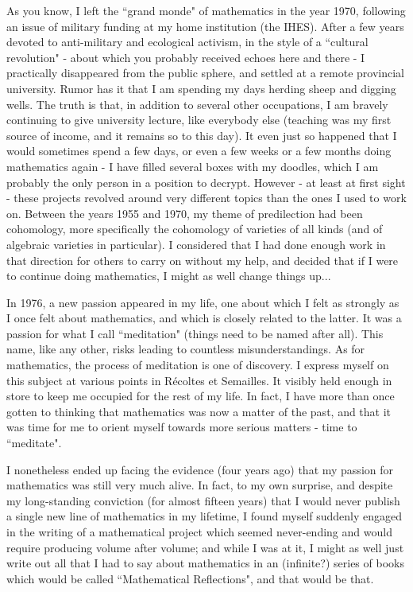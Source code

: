 As you know, I left the ``grand monde" of mathematics in the year 1970, following an issue of military funding at my home institution (the IHES). After a few years devoted to anti-military and ecological activism, in the style of a ``cultural revolution" - about which you probably received echoes here and there - I practically disappeared from the public sphere, and settled at a remote provincial university. Rumor has it that I am spending my days herding sheep and digging wells. The truth is that, in addition to several other occupations, I am bravely continuing to give university lecture, like everybody else (teaching was my first source of income, and it remains so to this day). It even just so happened that I would sometimes spend a few days, or even a few weeks or a few months doing mathematics again - I have filled several boxes with my doodles, which I am probably the only person in a position to decrypt. However - at least at first sight - these projects revolved around very different topics than the ones I used to work on. Between the years 1955 and 1970, my theme of predilection had been cohomology, more specifically the cohomology of varieties of all kinds (and of algebraic varieties in particular). I considered that I had done enough work in that direction for others to carry on without my help, and decided that if I were to continue doing mathematics, I might as well change things up...

In 1976, a new passion appeared in my life, one about which I felt as strongly as I once felt about mathematics, and which is closely related to the latter. It was a passion for what I call ``meditation" (things need to be named after all). This name, like any other, risks leading to countless misunderstandings. As for mathematics, the process of meditation is one of discovery. I express myself on this subject at various points in R\'ecoltes et Semailles. It visibly held enough in store to keep me occupied for the rest of my life. In fact, I have more than once gotten to thinking that mathematics was now a matter of the past, and that it was time for me to orient myself towards more serious matters - time to ``meditate".

I nonetheless ended up facing the evidence (four years ago) that my passion for mathematics was still very much alive. In fact, to my own surprise, and despite my long-standing conviction (for almost fifteen years) that I would never publish a single new line of mathematics in my lifetime, I found myself suddenly engaged in the writing of a mathematical project which seemed never-ending and would require producing volume after volume; and while I was at it, I might as well just write out all that I had to say about mathematics in an (infinite?) series of books which would be called ``Mathematical Reflections", and that would be that.

